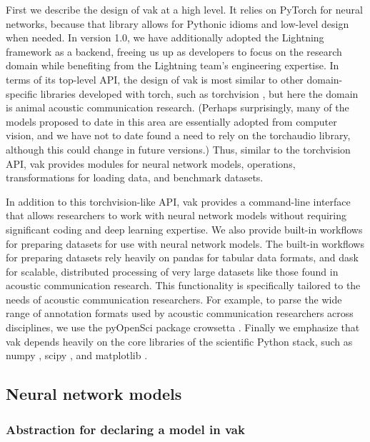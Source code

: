First we describe the design of vak at a high level. It relies on PyTorch \cite{paszkeAutomaticDifferentiationPyTorch2017} for neural networks, because that library allows for Pythonic idioms and low-level design when needed. In version 1.0, we have additionally adopted the Lightning framework \cite{falconPyTorchLightning2023} as a backend, freeing us up as developers to focus on the research domain while benefiting from the Lightning team's engineering expertise. In terms of its top-level API, the design of vak is most similar to other domain-specific libraries developed with torch, such as torchvision \cite{torchvision2016}, but here the domain is animal acoustic communication research. (Perhaps surprisingly, many of the models proposed to date in this area are essentially adopted from computer vision, and we have not to date found a need to rely on the torchaudio library, although this could change in future versions.) Thus, similar to the torchvision API, vak provides modules for neural network models, operations, transformations for loading data, and benchmark datasets.

In addition to this torchvision-like API, vak provides a command-line interface that allows researchers to work with neural network models without requiring significant coding and deep learning expertise. We also provide built-in workflows for preparing datasets for use with neural network models. The built-in workflows for preparing datasets rely heavily on pandas \cite{team_pandas-devpandas_2020} for tabular data formats, and dask \cite{dask_development_team_dask_2016} for scalable, distributed processing of very large datasets like those found in acoustic communication research. This functionality is specifically tailored to the needs of acoustic communication researchers. For example, to parse the wide range of annotation formats used by acoustic communication researchers across disciplines, we use the pyOpenSci package crowsetta \cite{nicholsonCrowsetta2022}. Finally we emphasize that vak depends heavily on the core libraries of the scientific Python stack, such as numpy \cite{walt_numpy_2011,harris2020array}, scipy \cite{virtanen_scipy_2019}, and matplotlib \cite{Hunter:2007, thomas_a_caswell_2020_4030140}.

\subsection{Neural network models \label{subsec:models}}

\subsubsection{Abstraction for declaring a model in vak \label{subsubsec:declaring-model}}

